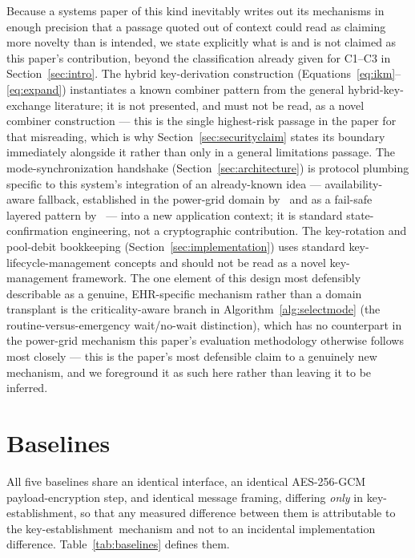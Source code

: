 \documentclass[journal]{IEEEtran}
\newcommand{\keyest}{key-establishment}
\begin{document}
Because a systems paper of this kind inevitably writes out its mechanisms in enough precision that a passage quoted out of context could read as claiming more novelty than is intended, we state explicitly what is and is not claimed as this paper's contribution, beyond the classification already given for C1--C3 in Section~\ref{sec:intro}. The hybrid key-derivation construction (Equations~\eqref{eq:ikm}--\eqref{eq:expand}) instantiates a known combiner pattern from the general hybrid-key-exchange literature; it is not presented, and must not be read, as a novel combiner construction --- this is the single highest-risk passage in the paper for that misreading, which is why Section~\ref{sec:securityclaim} states its boundary immediately alongside it rather than only in a general limitations passage. The mode-synchronization handshake (Section~\ref{sec:architecture}) is protocol plumbing specific to this system's integration of an already-known idea --- availability-aware fallback, established in the power-grid domain by~\cite{zhu2025technoeconomic} and as a fail-safe layered pattern by~\cite{spooren2026pqcenhanced} --- into a new application context; it is standard state-confirmation engineering, not a cryptographic contribution. The key-rotation and pool-debit bookkeeping (Section~\ref{sec:implementation}) uses standard key-lifecycle-management concepts and should not be read as a novel key-management framework. The one element of this design most defensibly describable as a genuine, EHR-specific mechanism rather than a domain transplant is the criticality-aware branch in Algorithm~\ref{alg:selectmode} (the routine-versus-emergency wait/no-wait distinction), which has no counterpart in the power-grid mechanism this paper's evaluation methodology otherwise follows most closely --- this is the paper's most defensible claim to a genuinely new mechanism, and we foreground it as such here rather than leaving it to be inferred.

\section{Baselines}
\label{sec:baselines}

All five baselines share an identical interface, an identical AES-256-GCM payload-encryption step, and identical message framing, differing \emph{only} in \keyest, so that any measured difference between them is attributable to the \keyest\ mechanism and not to an incidental implementation difference. Table~\ref{tab:baselines} defines them.
\end{document}
